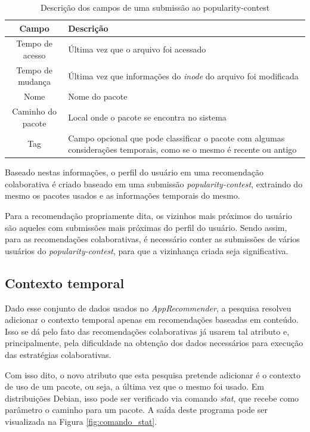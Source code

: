 \begin{table}[h!]
\centering
\newcommand\T{\rule{0pt}{2.8ex}}
\newcommand\B{\rule[-1.8ex]{0pt}{0pt}}
\begin{tabularx}{15cm}{| c | X |}
\hline
\rowcolor[HTML]{EFEFEF}
{\textbf{Campo}} & \textbf{Descrição} \\ \hline
{Tempo de acesso}  & Última vez que o arquivo foi acessado \\ \hline
{Tempo de mudança}   & Última vez que informações do \textit{inode} do arquivo foi
                       modificada\\ \hline
{Nome}   & Nome do pacote                  \\ \hline
{Caminho do pacote}   & Local onde o pacote se encontra no sistema \\ \hline
{Tag}   & Campo opcional que pode classificar o pacote com algumas considerações
temporais, como se o mesmo é recente ou antigo\\ \hline
\end{tabularx}
\caption{Descrição dos campos de uma submissão ao popularity-contest}
\label{tab:submissao_popcon}
\end{table}

Baseado nestas informações, o perfil do usuário em uma recomendação colaborativa
é criado baseado em uma submissão \textit{popularity-contest}, extraindo do mesmo os pacotes usados e
as informações temporais do mesmo.

Para a recomendação propriamente dita, os vizinhos mais próximos do usuário são
aqueles com submissões mais próximas do perfil do usuário. Sendo assim, para as
recomendações colaborativas, é necessário conter as submissões de vários
usuários do \textit{popularity-contest}, para que a vizinhança criada seja significativa.

\subsection{Contexto temporal} \label{sec:contexto_temporal}

Dado esse conjunto de dados usados no \textit{AppRecommender}, a pesquisa resolveu
adicionar o contexto temporal apenas em recomendações baseadas em conteúdo. Isso
se dá pelo fato das recomendações colaborativas já usarem tal atributo e,
principalmente, pela dificuldade na obtenção dos dados necessários para execução
das estratégias colaborativas.

Com isso dito, o novo atributo que esta pesquisa pretende
adicionar é o contexto de uso de um pacote, ou seja, a última vez que o
mesmo foi usado. Em distribuições Debian, isso pode ser verificado via comando
\textit{stat}, que recebe como parâmetro o caminho para um pacote.
A saída deste programa pode ser visualizada na Figura \ref{fig:comando_stat}.

